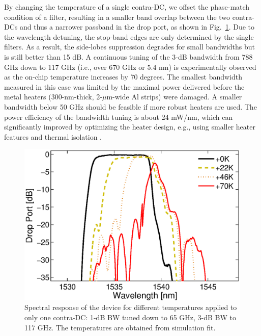 \documentclass[osajnl,twocolumn,showpacs,superscriptaddress,10pt]{revtex4-1}
\begin{document}
By changing the temperature of a single contra-DC, we offset the phase-match condition of a filter, resulting in a smaller band overlap between the two contra-DCs and thus a narrower passband in the drop port, as shown in Fig.~\ref{fig:bandTune}.  
Due to the wavelength detuning,  the stop-band edges are only determined by the single filters. 
As a result, the side-lobes suppression degrades  for small bandwidths but is still better than 15 dB. A continuous tuning of the 3-dB bandwidth from 788 GHz down to 117 GHz (i.e., over 670 GHz or 5.4 nm) is experimentally observed as the on-chip temperature increases by 70 degrees. 
The smallest bandwidth measured in this case was limited by the maximal power delivered before the metal heaters (300-nm-thick, 2-$\mu$m-wide Al strips) were damaged. A smaller bandwidth below 50 GHz should be feasible if more robust heaters are used.
The power efficiency of the bandwidth tuning is about 24 mW/nm, which can significantly improved by optimizing the heater design, e.g., using smaller heater features and thermal isolation \cite{dong2010thermally}.

\begin{figure}[htbp]
\centering
\includegraphics[width=.99\columnwidth]{data/Band5}
\caption{Spectral response of the device for different temperatures applied to only one contra-DC: 1-dB BW tuned down to 65 GHz, 3-dB BW to 117 GHz. The temperatures are obtained from simulation fit.}
\label{fig:bandTune}
\end{figure} 
\end{document}
